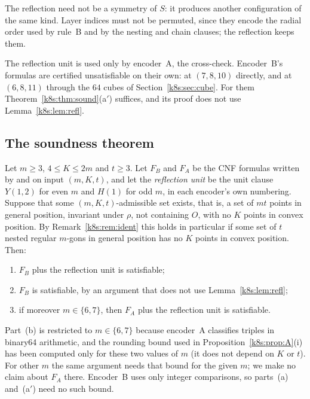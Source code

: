 The reflection need not be a symmetry of $S$: it produces another configuration of the same kind. Layer indices
must not be permuted, since they encode the radial order used by rule~B and by the nesting and chain clauses; the
reflection keeps them.

The reflection unit is used only by encoder~A, the cross-check. Encoder~B's formulas are certified unsatisfiable on
their own: at $(7,8,10)$ directly, and at $(6,8,11)$ through the $64$ cubes of Section~\ref{k8s:sec:cube}. For them
Theorem~\ref{k8s:thm:sound}(a$'$) suffices, and its proof does not use Lemma~\ref{k8s:lem:refl}.

\subsection{The soundness theorem}\label{k8s:sec:theorem}

\begin{theorem}\label{k8s:thm:sound}
Let $m\ge3$, $4\le K\le2m$ and $t\ge3$. Let $F_B$ and $F_A$ be the CNF formulas written by  and
 on input $(m,K,t)$, and let the \emph{reflection unit} be the unit clause $Y(1,2)$ for even $m$ and
$H(1)$ for odd $m$, in each encoder's own numbering. Suppose that some $(m,K,t)$-admissible set exists, that is, a
set of $mt$ points in general position, invariant under $\rho$, not containing $O$, with no $K$ points in convex
position. By Remark~\ref{k8s:rem:ident} this holds in particular if some set of $t$ nested regular $m$-gons in general
position has no $K$ points in convex position. Then:
\begin{enumerate}[label=(\alph*)]
\item $F_B$ plus the reflection unit is satisfiable;
\item[(a$'$)] $F_B$ is satisfiable, by an argument that does not use Lemma~\ref{k8s:lem:refl};
\item if moreover $m\in\{6,7\}$, then $F_A$ plus the reflection unit is satisfiable.
\end{enumerate}
\end{theorem}

Part~(b) is restricted to $m\in\{6,7\}$ because encoder~A classifies triples in binary64 arithmetic, and the rounding
bound used in Proposition~\ref{k8s:prop:A}(i) has been computed only for these two values of $m$ (it does not depend on
$K$ or $t$). For other $m$ the same argument needs that bound for the given $m$; we make no claim about $F_A$ there.
Encoder~B uses only integer comparisons, so parts~(a) and~(a$'$) need no such bound.

